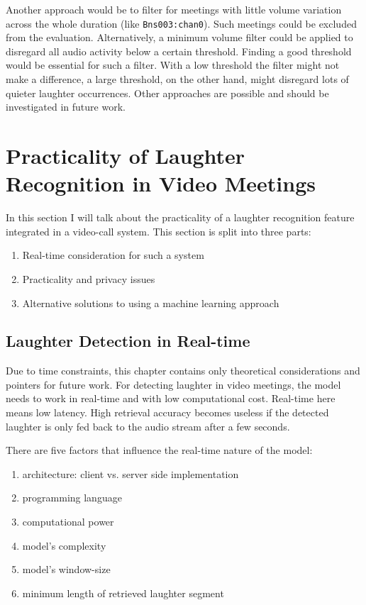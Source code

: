 \documentclass[bsc,frontabs,parskip,deptreport]{infthesis}
\begin{document}
Another approach would be to filter for meetings with little volume variation across the whole duration (like \verb|Bns003:chan0|).
Such meetings could be excluded from the evaluation. 
Alternatively, a minimum volume filter could be applied to disregard all audio activity below a certain threshold.
Finding a good threshold would be essential for such a filter. With a low threshold the filter might not make a difference, a large threshold, on the other hand, might disregard lots of quieter laughter occurrences. 
Other approaches are possible and should be investigated in future work.



\chapter{Practicality of Laughter Recognition in Video Meetings} \label{cha:practicality}
In this section I will talk about the practicality of a laughter recognition feature integrated in a video-call system. 
This section is split into three parts: 
\begin{enumerate}
    \item Real-time consideration for such a system
    \item Practicality and privacy issues 
    \item Alternative solutions to using a machine learning approach 
\end{enumerate}

\section{Laughter Detection in Real-time} \label{sec:real-time}
Due to time constraints, this chapter contains only theoretical considerations and pointers for future work. 
For detecting laughter in video meetings, the model needs to work in real-time and with low computational cost. Real-time here means low latency.
High retrieval accuracy becomes useless if the detected laughter is only fed back to the audio stream after a few seconds.


There are five factors that influence the real-time nature of the model:
\begin{enumerate}
    \item architecture: client vs. server side implementation
    \item programming language
    \item computational power 
    \item model's complexity
    \item model's window-size
    \item minimum length of retrieved laughter segment
\end{enumerate}
\end{document}
